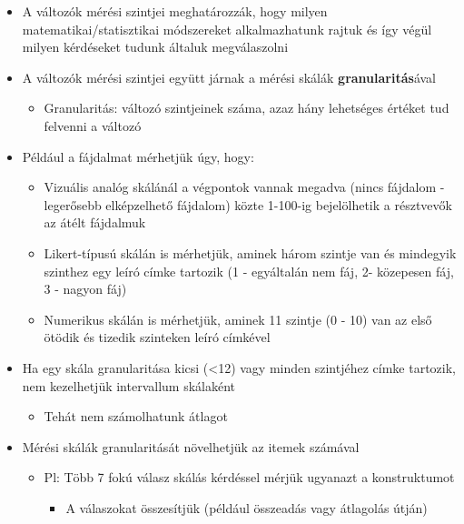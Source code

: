 \documentclass[
  letterpaper,
  DIV=11,
  numbers=noendperiod]{scrreprt}
\providecommand{\tightlist}{%
  \setlength{\itemsep}{0pt}\setlength{\parskip}{0pt}}\usepackage{longtable,booktabs,array}
\begin{document}
\begin{itemize}
\item
  A változók mérési szintjei meghatározzák, hogy milyen
  matematikai/statisztikai módszereket alkalmazhatunk rajtuk és így
  végül milyen kérdéseket tudunk általuk megválaszolni
\item
  A változók mérési szintjei együtt járnak a mérési skálák
  \textbf{granularitás}ával

  \begin{itemize}
  \tightlist
  \item
    Granularitás: változó szintjeinek száma, azaz hány lehetséges
    értéket tud felvenni a változó
  \end{itemize}
\item
  Például a fájdalmat mérhetjük úgy, hogy:

  \begin{itemize}
  \item
    Vizuális analóg skálánál a végpontok vannak megadva (nincs fájdalom
    - legerősebb elképzelhető fájdalom) közte 1-100-ig bejelölhetik a
    résztvevők az átélt fájdalmuk
  \item
    Likert-típusú skálán is mérhetjük, aminek három szintje van és
    mindegyik szinthez egy leíró címke tartozik (1 - egyáltalán nem fáj,
    2- közepesen fáj, 3 - nagyon fáj)
  \item
    Numerikus skálán is mérhetjük, aminek 11 szintje (0 - 10) van az
    első ötödik és tizedik szinteken leíró címkével
  \end{itemize}
\item
  Ha egy skála granularitása kicsi (\textless12) vagy minden szintjéhez
  címke tartozik, nem kezelhetjük intervallum skálaként

  \begin{itemize}
  \tightlist
  \item
    Tehát nem számolhatunk átlagot
  \end{itemize}
\item
  Mérési skálák granularitását növelhetjük az itemek számával

  \begin{itemize}
  \item
    Pl: Több 7 fokú válasz skálás kérdéssel mérjük ugyanazt a
    konstruktumot

    \begin{itemize}
    \tightlist
    \item
      A válaszokat összesítjük (például összeadás vagy átlagolás útján)
    \end{itemize}
  \end{itemize}
\end{itemize}
\end{document}
